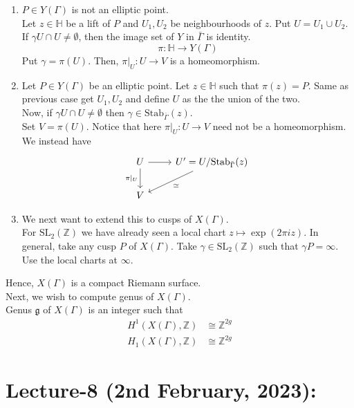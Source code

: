 \documentclass[oneside, 12pt, ]{scrbook}
\newcommand{\ZZ}{\mathbb Z}
\newcommand{\SL}{\mathrm{SL}}
\newcommand{\HH}{\mathbb{H}}
\newcommand{\Stab}{\mathrm{Stab}}
\theoremstyle{theorem}
\begin{document}
\begin{enumerate}
\item $P \in Y(\Gamma)$ is not an elliptic point. \\

Let $z\in \HH$ be a lift of $P$ and $U_{1},U_{2}$ be neighbourhoods of $z$. Put $U=U_{1} \cup U_{2}$. If $\gamma U \cap U \neq \emptyset$, then the image set of $Y$ in $\bar{\Gamma}$ is identity. 
$$\pi : \HH \rightarrow Y(\Gamma)$$
Put $\gamma   = \pi (U)$. Then, $\pi|_{U} : U \rightarrow V$ is a homeomorphism. 

\item Let $P \in Y(\Gamma)$ be an elliptic point. Let $z\in \HH$ such that $\pi(z) = P$. Same as previous case get $U_{1},U_{2}$ and define $U$ as the the union of the two. \\
Now, if $\gamma U \cap U \neq \emptyset$ then $\gamma \in \Stab_{\bar{\Gamma}}(z)$. \\
Set $V= \pi (U)$. Notice that here $\pi|_{U}: U \rightarrow V$ need not be a homeomorphism. We instead have 
\[\begin{tikzcd}
	U & {U'=U/\mathrm{Stab}_{\bar{\Gamma}}(z)} \\
	V
	\arrow["{\pi|_{U} }"', from=1-1, to=2-1]
	\arrow[from=1-1, to=1-2]
	\arrow["\simeq", from=1-2, to=2-1]
\end{tikzcd}\]

\item We next want to extend this to cusps of $X(\Gamma)$. \\
For $\SL_{2}(\ZZ)$ we have already seen a local chart $z\mapsto \exp(2 \pi i z)$. In general, take any cusp $P$ of $X(\Gamma)$. Take $\gamma \in \SL_{2}(\ZZ)$ such that $\gamma P = \infty$. Use the local charts at $\infty$.
\end{enumerate}
Hence, $X(\Gamma)$ is a compact Riemann surface. \\

Next, we wish to compute genus of $X(\Gamma)$. \\
Genus $\mathfrak{g}$ of $X(\Gamma)$ is an integer such that 
\begin{align*}
H^1(X(\Gamma), \ZZ) &\cong \ZZ^{2g} \\
H_{1}(X(\Gamma), \ZZ) &\cong \ZZ^{2g}
\end{align*}


\chapter{Lecture-8 (2nd February, 2023): }
\end{document}
